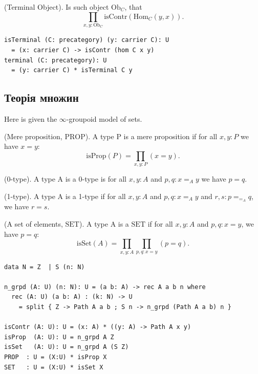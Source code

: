 \begin{definition} (Terminal Object). Is such object $\mathrm{Ob}_C$,
that
$$
    \prod_{x,y:\mathrm{Ob}_C} \mathrm{isContr} (\mathrm{Hom}_C(y,x)).
$$
\begin{lstlisting}
isTerminal (C: precategory) (y: carrier C): U
  = (x: carrier C) -> isContr (hom C x y)
terminal (C: precategory): U
  = (y: carrier C) * isTerminal C y
\end{lstlisting}
\end{definition}


\subsection{Теорія множин}

Here is given the $\infty$-groupoid model of sets.

\begin{definition} (Mere proposition, $\mathrm{PROP}$).
A type P is a mere proposition if for all $x,y: P$ we have $x=y$:
$$
    \mathrm{isProp}(P) = \prod_{x,y:P}(x=y).
$$
\end{definition}

\begin{definition} (0-type).
A type A is a 0-type is for all $x,y: A$ and $p,q: x =_A y$ we have $p = q$.
\end{definition}

\begin{definition} (1-type).
A type A is a 1-type if for all $x,y: A$ and $p,q: x =_A y$ and $r,s:p =_{=_A} q$, we have $r = s$.
\end{definition}

\begin{definition} (A set of elements, $\mathrm{SET}$).
A type A is a $\mathrm{SET}$ if for all $x,y: A$ and $p,q: x = y$, we have $p = q$:
$$
    \mathrm{isSet}(A) = \prod_{x,y:A}\prod_{p,q:x=y}(p=q).
$$
\end{definition}

\begin{definition}
\begin{lstlisting}
data N = Z  | S (n: N)

n_grpd (A: U) (n: N): U = (a b: A) -> rec A a b n where
  rec (A: U) (a b: A) : (k: N) -> U
    = split { Z -> Path A a b ; S n -> n_grpd (Path A a b) n }

isContr (A: U): U = (x: A) * ((y: A) -> Path A x y)
isProp  (A: U): U = n_grpd A Z
isSet   (A: U): U = n_grpd A (S Z)
PROP  : U = (X:U) * isProp X
SET   : U = (X:U) * isSet X
\end{lstlisting}
\end{definition}

